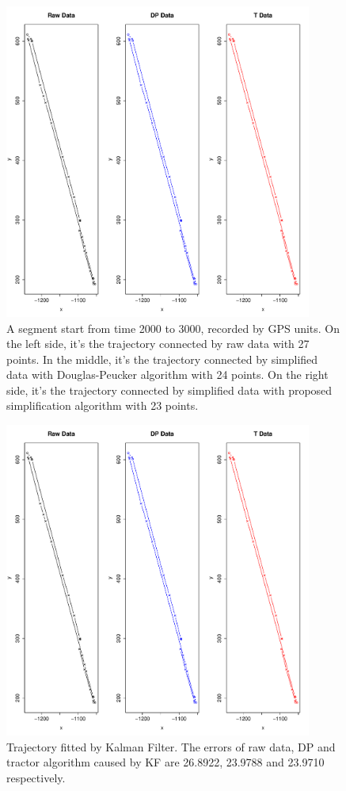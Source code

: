 \begin{figure}
\centering
\includegraphics[width=0.9\textwidth]{Chapters/06Spinoff/plot/3p1.pdf}
\caption{A segment start from time 2000 to 3000, recorded by GPS units. On the left side, it's the trajectory connected by raw data with 27 points. In the middle, it's the trajectory connected by simplified data with Douglas-Peucker algorithm with 24 points. On the right side, it's the trajectory connected by simplified data with proposed simplification algorithm with 23 points.}\label{DataSimpRawTra}
\end{figure}

\begin{figure}
\centering
\includegraphics[width=0.9\textwidth]{Chapters/06Spinoff/plot/km3p}
\caption{Trajectory fitted by Kalman Filter. The errors of raw data, DP and tractor algorithm caused by KF are 26.8922, 23.9788 and 23.9710 respectively.}\label{DataSimpKFTra}
\end{figure}


